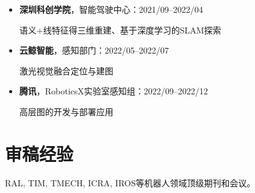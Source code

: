 \documentclass[11pt,a4paper,sans]{moderncv}        %
\begin{document}
\begin{itemize}

\item{\textbf{深圳科创学院}，智能驾驶中心：2021/09--2022/04}

语义+线特征得三维重建、基于深度学习的SLAM探索

\item{\textbf{云鲸智能}，感知部门：2022/05--2022/07}

激光视觉融合定位与建图

\item{\textbf{腾讯}，RoboticsX实验室感知组：2022/09--2022/12}

高层图的开发与部署应用

\end{itemize}

\section{审稿经验}
RAL, TIM, TMECH, ICRA, IROS等机器人领域顶级期刊和会议。



    




\end{document}
